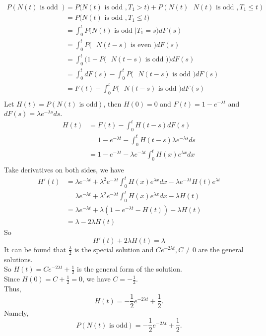 \documentclass{amsart}
\theoremstyle{plain}
\theoremstyle{definition}
\begin{document}
\begin{align*}
	P(N(t) \text{ is odd } ) &= P\big(N(t) \text{ is odd }, T_1 > t\big) + P(N(t) \text{ $N(t)$ is odd }, T_1 \leq t) \\
							 &= P\big(N(t)\text{ is odd }, T_1 \leq t\big) \\
						 	 &= \int_{0}^{t}P\big(N(t) \text{ is odd }|T_1 = s\big)dF(s) \\
							 &= \int_{0}^{t}P\big(\text{ $N(t-s)$ is even })dF(s) \\
							 &= \int_{0}^{t}\Big(1-P\big(\text{ $N(t-s)$ is odd }\big)\Big)dF(s) \\
							 &= \int_{0}^{t}dF(s) -\int_{0}^{t}P\big(\text{ $N(t-s)$ is odd }\big)dF(s) \\
							 &= F(t) -\int_{0}^{t}P\big(\text{ $N(t-s)$ is odd }\big)dF(s) \\
\end{align*}
Let $H(t) = P(N(t) \text{ is odd} )$, then $H(0) = 0$ and $F(t) = 1 -e^{-\lambda t}$ and $dF(s) = \lambda e^{-\lambda s}ds$.
\begin{align*}
	H(t) &= F(t)-\int_{0}^{t}H(t-s)dF(s) \\
			   &= 1 -e^{-\lambda t} - \int_{0}^{t}H(t-s) \lambda e^{-\lambda s}ds \\
			   &=1 -e^{-\lambda t} - \lambda e^{-\lambda t}\int_{0}^{t}H(x)e^{\lambda x}dx \\
\end{align*}
Take derivatives on both sides, we have\\
\begin{align*}
	H'(t) &= \lambda e^{-\lambda t} +\lambda^2e^{-\lambda t}\int_{0}^{t}H(x)e^{\lambda x}dx-\lambda e^{-\lambda t}H(t)e^{\lambda t}\\
		  &= \lambda e^{-\lambda t} +\lambda^2e^{-\lambda t}\int_{0}^{t}H(x)e^{\lambda x}dx-\lambda H(t)\\
		  &= \lambda e^{-\lambda t} + \lambda(1-e^{-\lambda t}-H(t)) -\lambda H(t)\\
		  &= \lambda - 2\lambda H(t) 
\end{align*}
So 
\[H'(t) + 2\lambda H(t) = \lambda \]
It can be found that $\frac{\lambda}{2}$ is the special solution and $Ce^{-2\lambda t}, C \neq 0$ are the general solutions.\\
So $H(t) = Ce^{-2\lambda t} + \frac{1}{2}$ is the general form of the solution.\\
Since $H(0) = C+ \frac{1}{2} = 0$, we have $C = -\frac{1}{2}$.\\
Thus,
\[ H(t) = -\frac{1}{2}e^{-2\lambda t} + \frac{1}{2}.\]
Namely,
\[ P(N(t) \text{ is odd} ) = -\frac{1}{2}e^{-2\lambda t} + \frac{1}{2}.\]
\vspace{5mm}
\end{document}
